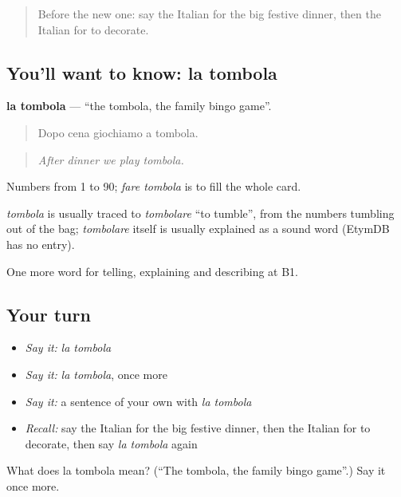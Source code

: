 \label{lesson:IT-C321-tombola}



\begin{quote}
Before the new one: say the Italian for the big festive dinner, then the Italian for to decorate.
\end{quote}

\subsection*{You'll want to know: la tombola}
\textbf{la tombola} — \textquotedblleft{}the tombola, the family bingo game\textquotedblright{}.

\begin{quote}
Dopo cena giochiamo a tombola.
\end{quote}

\begin{quote}
\emph{After dinner we play tombola.}
\end{quote}

Numbers from 1 to 90; \emph{fare tombola} is to fill the whole card.

\begin{cousinweb}
\emph{tombola} is usually traced to \emph{tombolare} \textquotedblleft{}to tumble\textquotedblright{}, from the numbers tumbling out of the bag; \emph{tombolare} itself is usually explained as a sound word (EtymDB has no entry).
\end{cousinweb}

\begin{grammarlens}[title={What you've built}]
One more word for telling, explaining and describing at B1.
\end{grammarlens}

\subsection*{Your turn}
\begin{itemize}
\raggedright
  \item \emph{Say it:} \emph{la tombola}
  \item \emph{Say it:} \emph{la tombola}, once more
  \item \emph{Say it:} a sentence of your own with \emph{la tombola}
  \item \emph{Recall:} say the Italian for the big festive dinner, then the Italian for to decorate, then say \emph{la tombola} again
\end{itemize}

\begin{tcolorbox}[breakable,colback=teal!4,colframe=teal!35!black,title={Before you move on}]
What does la tombola mean? (\textquotedblleft{}The tombola, the family bingo game\textquotedblright{}.) Say it once more.
\end{tcolorbox}
